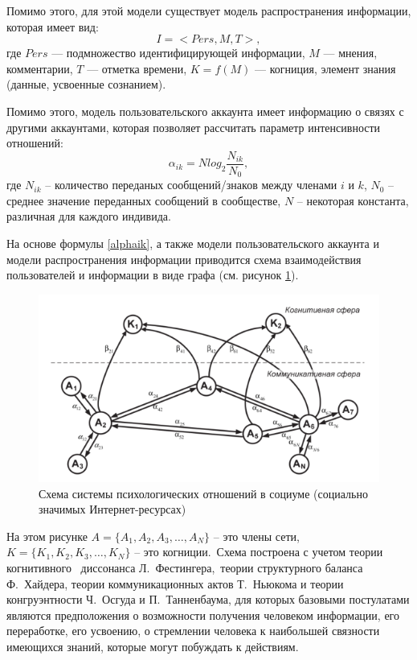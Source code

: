 Помимо этого, для этой модели существует модель распространения информации, которая имеет вид:
\begin{equation}
    I = <Pers, M, T>,
\end{equation}
где $Pers$ — подмножество идентифицирующей информации, $M$ — мнения, комментарии,
$T$ — отметка времени, $K = f(M)$ — когниция, элемент знания (данные, усвоенные сознанием).

Помимо этого, модель пользовательского аккаунта имеет информацию о связях с другими аккаунтами,
которая позволяет рассчитать параметр интенсивности отношений:
\begin{equation}\label{alphaik}
    \alpha_{ik} = N log_{2} \frac{N_{ik}}{N_{0}},
\end{equation}
где $N_{ik}$ – количество переданых сообщений/знаков между членами $i$ и $k$,
$N_{0}$ – среднее значение переданных сообщений в сообществе, $N$ – некоторая константа, различная для каждого индивида.

На основе формулы \ref{alphaik}, а также модели пользовательского аккаунта и модели распространения информации
приводится схема взаимодействия пользователей и информации в виде графа (см. рисунок \ref{fig:shema_system_in_socium}).

\begin{figure}[h!]
    \centering
    \captionsetup{justification=centering}
    \includegraphics[width=0.8\linewidth]{pictures/schema_system_in_socium.png}
    \caption{Схема системы психологических отношений в социуме (социально значимых Интернет-ресурсах)}
    \label{fig:shema_system_in_socium}
\end{figure}

На этом рисунке $A = \{ A_{1}, A_{2}, A_{3}, \dots, A_{N}\}$ – это члены сети,
$K = \{ K_{1}, K_{2}, K_{3}, \dots, K_{N}\}$ – это когниции.~Схема построена с учетом теории когнитивного
~диссонанса Л.~Фестингера,~теории структурного баланса Ф.~Хайдера, теории коммуникационных актов Т.~Ньюкома
и теории конгруэнтности Ч.~Осгуда и П.~Танненбаума, для которых базовыми постулатами являются предположения
о возможности получения человеком информации, его переработке, его усвоению, о стремлении человека к наибольшей
связности имеющихся знаний, которые могут побуждать к действиям.

